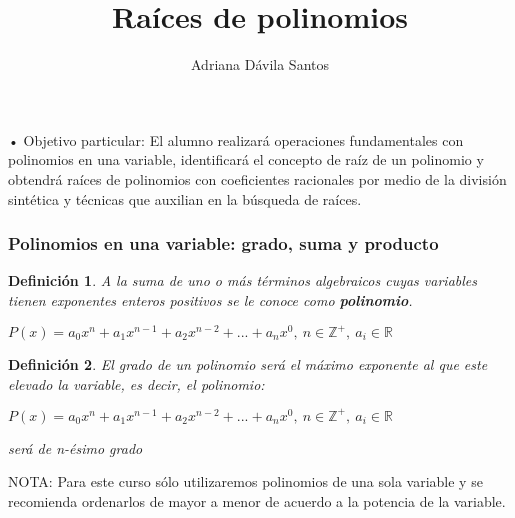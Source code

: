 \documentclass[11pt]{beamer}
\author{Adriana Dávila Santos}
\title{Raíces de polinomios}
\newtheorem{defi}{Definición}
\begin{document}
\begin{frame}
\titlepage
\end{frame}


\begin{frame}{• Objetivo particular:}
El alumno realizará operaciones fundamentales con polinomios en una variable, identificará el
concepto de raíz de un polinomio y obtendrá raíces de polinomios con coeficientes racionales
por medio de la división sintética y técnicas que auxilian en la búsqueda de raíces.
\end{frame}

\begin{frame}
\frametitle{Polinomios en una variable: grado, suma y producto}
\begin{defi}
A la suma de uno o más términos algebraicos cuyas variables tienen exponentes enteros positivos se le conoce como \textbf{polinomio}.
\begin{center}
$P(x) = a_0x^n + a_1x^{n-1} + a_2x^{n-2} + ... + a_nx^{0},~n\in \mathbb{Z}^+, ~ a_i\in \mathbb{R}$
\end{center}
\end{defi}
\begin{defi}
El grado de un polinomio será el máximo exponente al que este elevado la variable, es decir, el polinomio: \\
\begin{center}
$P(x) = a_0x^n + a_1x^{n-1} + a_2x^{n-2} + ... + a_nx^{0},~n\in \mathbb{Z}^+, ~ a_i\in \mathbb{R}$\\
\end{center}
será de n-ésimo grado
\end{defi}
NOTA: Para este curso sólo utilizaremos polinomios de una sola variable y se recomienda ordenarlos de mayor a menor de acuerdo a la potencia de la variable.
\end{frame}
\end{document}
